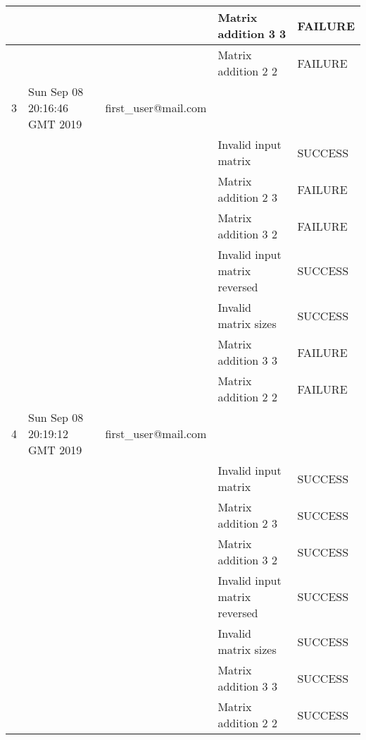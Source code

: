 \begin{table}[H]
{\begin{tabular}{|l|l|l|l|l|}
    &                              &                                 & Matrix addition 3 3           & FAILURE \\ \hline
    &                              &                                 & Matrix addition 2 2           & FAILURE \\ \hline
    3     & Sun Sep 08 20:16:46 GMT 2019 & first\_user@mail.com &                               &         \\ \hline
    &                              &                                 & Invalid input matrix          & SUCCESS \\ \hline
    &                              &                                 & Matrix addition 2 3           & FAILURE \\ \hline
    &                              &                                 & Matrix addition 3 2           & FAILURE \\ \hline
    &                              &                                 & Invalid input matrix reversed & SUCCESS \\ \hline
    &                              &                                 & Invalid matrix sizes          & SUCCESS \\ \hline
    &                              &                                 & Matrix addition 3 3           & FAILURE \\ \hline
    &                              &                                 & Matrix addition 2 2           & FAILURE \\ \hline
    4     & Sun Sep 08 20:19:12 GMT 2019 & first\_user@mail.com &                               &         \\ \hline
    &                              &                                 & Invalid input matrix          & SUCCESS \\ \hline
    &                              &                                 & Matrix addition 2 3           & SUCCESS \\ \hline
    &                              &                                 & Matrix addition 3 2           & SUCCESS \\ \hline
    &                              &                                 & Invalid input matrix reversed & SUCCESS \\ \hline
    &                              &                                 & Invalid matrix sizes          & SUCCESS \\ \hline
    &                              &                                 & Matrix addition 3 3           & SUCCESS \\ \hline
    &                              &                                 & Matrix addition 2 2           & SUCCESS \\ \hline
\end{tabular}
\label{tab:matrix_addition}
}
\end{table}